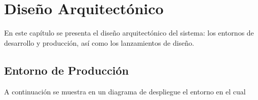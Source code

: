 \chapter{Diseño Arquitectónico}

	En este capítulo se presenta el diseño arquitectónico del sistema: los entornos de desarrollo y producción, así como los lanzamientos de diseño.
	
\section{Entorno de Producción}
A continuación se muestra en un diagrama de despliegue el entorno en el cual 



